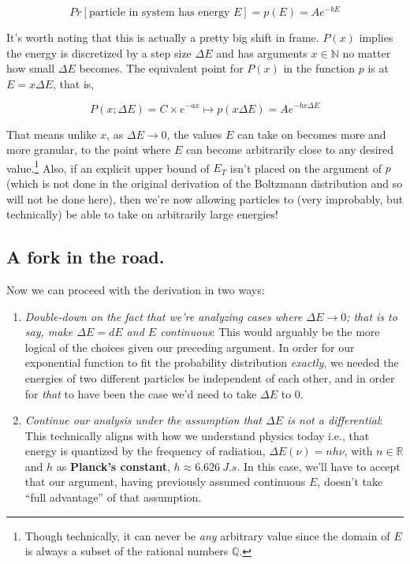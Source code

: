 \documentclass[letterpaper,12pt]{report}
\providecommand{\tightlist}{%
  \setlength{\itemsep}{0pt}\setlength{\parskip}{0pt}}
\begin{document}
\[Pr[\text{particle in system has energy }E] = p(E) = Ae^{-bE}\]

It's worth noting that this is actually a pretty big shift in frame. \(P(x)\) implies the energy
is discretized by a step size \(\Delta E\) and has arguments \(x \in \mathbb{N}\) no matter
how small \(\Delta E\) becomes. The equivalent point for \(P(x)\) in the function \(p\)
is at \(E = x\Delta E\), that is,

\[P(x; \Delta E) = C\times e^{-ax} \mapsto p(x\Delta E) = Ae^{-bx\Delta E} \]


That means unlike \(x\), as \(\Delta E \rightarrow 0\), the values
\(E\) can take on becomes more and more granular, 
to the point where \(E\) can become arbitrarily
close to any desired value.\footnote{
  Though technically, it can never be \emph{any} arbitrary value since the domain of \(E\)
  is always a subset of the rational numbers \(\mathbb{Q}\).
} Also, if an explicit upper bound of \(E_T\) isn't placed on the argument of \(p\)
(which is not done in the original derivation of the Boltzmann distribution 
and so will not be done here), then we're now allowing particles to
(very improbably, but technically) be able to take on arbitrarily large energies!

\subsection{A fork in the road.}

Now we can proceed with the derivation in two ways:
\begin{enumerate}
  \tightlist
  \item
    \emph{Double-down on the fact that we're analyzing cases where
     \(\Delta E \rightarrow 0\); that is to say,
    make \(\Delta E = dE\) and \(E\) continuous}:
    This would arguably be the more logical of the choices given our preceding argument.
    In order for our exponential function to fit the probability distribution \emph{exactly},
    we needed the energies of two different particles be independent of each other,
    and in order for \emph{that} to have been the case we'd need to take \(\Delta E\) to 0.
  \item
    \emph{Continue our analysis under the assumption that \(\Delta E\) is not a differential}:
    This technically aligns with how we understand physics today \textemdash{} i.e., that
    energy is quantized by the frequency of radiation,
    \(\Delta E(\nu) = nh\nu\), with \(n \in \mathbb{R}\) 
    and \(h\) as \textbf{Planck's constant},
    \(h \approx \SI{6.626}{J.s}\).
    In this case, we'll have to accept that our argument,
    having previously assumed continuous \(E\), 
    doesn't take ``full advantage'' of that assumption.
\end{enumerate}
\end{document}
